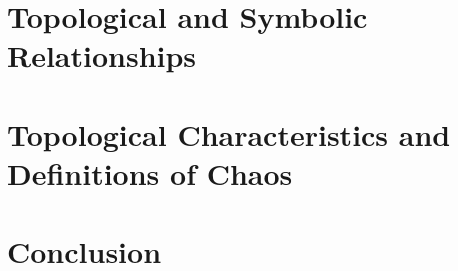 \documentclass[11pt,a4paper,oneside]{memoir}
\theoremstyle{plain}
\theoremstyle{definition}
\begin{document}
\chapter{Topological and Symbolic Relationships} \label{chap:conjugacy-symbol-dynamics}


\chapter{Topological Characteristics and Definitions of Chaos} \label{chap:defining-chaos}


\chapter{Conclusion} \label{chap:conclusion}



\end{document}
